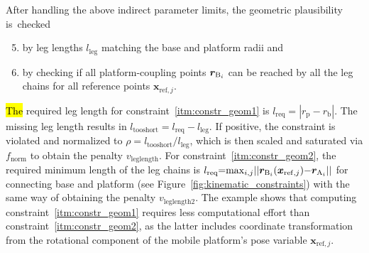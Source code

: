 After %
%
handling the above indirect parameter limits, the geometric plausibility is~checked
\begin{enumerate}
  \setcounter{enumi}{4}
  \item \label{itm:constr_geom1} by leg lengths $l_\text{leg}$ matching the base and platform {radii} and
  \item \label{itm:constr_geom2} by checking if all platform-coupling points $\boldsymbol{r}_{\mathrm{B}_i}$ can be reached by all the leg chains for all reference points $\bm{x}_{\mathrm{ref},j}$.
\end{enumerate}
%
\hl{The} %
%
required leg length for constraint~\ref*{itm:constr_geom1} is $l_{\text{req}}{=}|r_\mathrm{p} {-} r_\mathrm{b}|$.
The missing leg length results in $l_\text{tooshort} {=} l_{\text{req}} {-} l_\text{leg}$. 
If positive, the constraint is violated and normalized to $\rho{=}l_\text{tooshort}/l_\text{leg}$, which is then scaled and saturated via $f_\mathrm{norm}$ to obtain the penalty $v_\mathrm{leglength}$.
For constraint~\ref*{itm:constr_geom2}, the required minimum length of the leg chains is $l_{\text{req}}{=}\mathrm{max}_{i,j}||\boldsymbol{r}_{\mathrm{B}_i}(\bm{x}_{\mathrm{ref},j}){-}\boldsymbol{r}_{\mathrm{A}_i}||$ for connecting base and platform (see Figure~\ref{fig:kinematic_constraints}) with the same way of obtaining the penalty $v_\mathrm{leglength2}$. 
%
The example shows that computing constraint~\ref*{itm:constr_geom1} requires less computational effort than constraint~\ref*{itm:constr_geom2}, as the latter includes coordinate transformation from the rotational component of the mobile platform's pose variable $\bm{x}_{\mathrm{ref},j}$.


